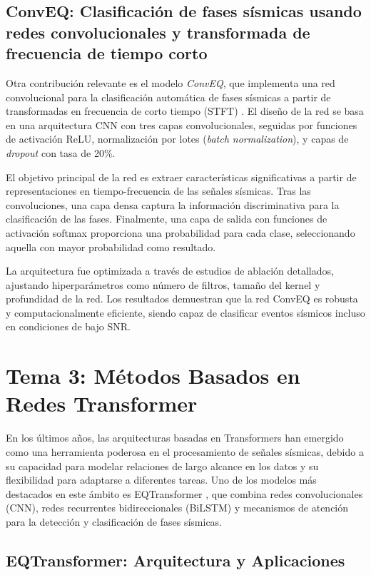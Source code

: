 \subsection{ConvEQ: Clasificación de fases sísmicas usando redes convolucionales y transformada de frecuencia de tiempo corto}

Otra contribución relevante es el modelo \textit{ConvEQ}, que implementa una red convolucional para la clasificación automática de fases sísmicas a partir de transformadas en frecuencia de corto tiempo (STFT) \cite{khattak2024conveq}. El diseño de la red se basa en una arquitectura CNN con tres capas convolucionales, seguidas por funciones de activación ReLU, normalización por lotes (\textit{batch normalization}), y capas de \textit{dropout} con tasa de 20\%.

El objetivo principal de la red es extraer características significativas a partir de representaciones en tiempo-frecuencia de las señales sísmicas. Tras las convoluciones, una capa densa captura la información discriminativa para la clasificación de las fases. Finalmente, una capa de salida con funciones de activación softmax proporciona una probabilidad para cada clase, seleccionando aquella con mayor probabilidad como resultado.

La arquitectura fue optimizada a través de estudios de ablación detallados, ajustando hiperparámetros como número de filtros, tamaño del kernel y profundidad de la red. Los resultados demuestran que la red ConvEQ es robusta y computacionalmente eficiente, siendo capaz de clasificar eventos sísmicos incluso en condiciones de bajo SNR.

\section{Tema 3: Métodos Basados en Redes Transformer}

En los últimos años, las arquitecturas basadas en Transformers han emergido como una herramienta poderosa en el procesamiento de señales sísmicas, debido a su capacidad para modelar relaciones de largo alcance en los datos y su flexibilidad para adaptarse a diferentes tareas. Uno de los modelos más destacados en este ámbito es EQTransformer \cite{mousavi2019cred}, que combina redes convolucionales (CNN), redes recurrentes bidireccionales (BiLSTM) y mecanismos de atención para la detección y clasificación de fases sísmicas.

\subsection{EQTransformer: Arquitectura y Aplicaciones}

